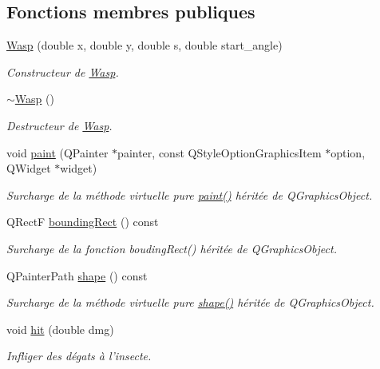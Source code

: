 \subsection*{Fonctions membres publiques}
\begin{DoxyCompactItemize}
\item 
\hyperlink{classWasp_a04c7736d744ab1c36b075f1e98ec93c2}{Wasp} (double x, double y, double s, double start\_\-angle)
\begin{DoxyCompactList}\small\item\em Constructeur de \hyperlink{classWasp}{Wasp}. \end{DoxyCompactList}\item 
\hyperlink{classWasp_ac4b6b3f99b8a044cc2047144f0e44bb1}{$\sim$Wasp} ()
\begin{DoxyCompactList}\small\item\em Destructeur de \hyperlink{classWasp}{Wasp}. \end{DoxyCompactList}\item 
void \hyperlink{classWasp_ac37833715ac95ea82a89c5cbd0fa26fb}{paint} (QPainter $\ast$painter, const QStyleOptionGraphicsItem $\ast$option, QWidget $\ast$widget)
\begin{DoxyCompactList}\small\item\em Surcharge de la méthode virtuelle pure \hyperlink{classWasp_ac37833715ac95ea82a89c5cbd0fa26fb}{paint()} héritée de QGraphicsObject. \end{DoxyCompactList}\item 
QRectF \hyperlink{classBug_a9b39c25361faad07b1bf2dd927d09dab}{boundingRect} () const 
\begin{DoxyCompactList}\small\item\em Surcharge de la fonction boudingRect() héritée de QGraphicsObject. \end{DoxyCompactList}\item 
QPainterPath \hyperlink{classBug_a587a36d3145c2b4dba6c689af22c65ac}{shape} () const 
\begin{DoxyCompactList}\small\item\em Surcharge de la méthode virtuelle pure \hyperlink{classBug_a587a36d3145c2b4dba6c689af22c65ac}{shape()} héritée de QGraphicsObject. \end{DoxyCompactList}\item 
void \hyperlink{classBug_a63402c05b5ba3fb034e41f1ced0e4b9f}{hit} (double dmg)
\begin{DoxyCompactList}\small\item\em Infliger des dégats à l'insecte. \end{DoxyCompactList}\item 

\end{DoxyCompactItemize}

